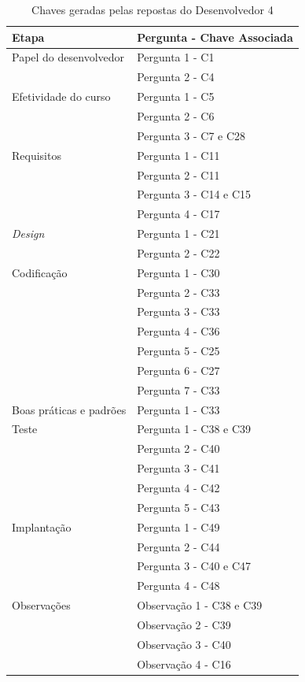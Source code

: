 \begin{table}[h]
	\centering
	\begin{tabular}{|m{4.8cm} | m{4.8cm} |}
		\hline
		\textbf{Etapa} & \textbf{Pergunta - Chave Associada} \\ \hline
		Papel do desenvolvedor & Pergunta 1 - C1 \\ \cline{2-2}
		& Pergunta 2 - C4 \\ \cline{2-2}
		\hline
		Efetividade do curso & Pergunta 1 - C5 \\ \cline{2-2}
		& Pergunta 2 - C6 \\ \cline{2-2}
		& Pergunta 3 - C7 e C28 \\ \cline{2-2}
		\hline
		Requisitos & Pergunta 1 - C11 \\ \cline{2-2}
		 & Pergunta 2 - C11 \\ \cline{2-2}
		& Pergunta 3 - C14 e C15 \\ \cline{2-2}
		& Pergunta 4 - C17 \\ \cline{2-2}
		\hline
		\textit{Design} & Pergunta 1 - C21 \\ \cline{2-2}
		& Pergunta 2 - C22 \\ \cline{2-2}
		\hline
		Codificação & Pergunta 1 - C30 \\ \cline{2-2}
		& Pergunta 2 - C33 \\ \cline{2-2}
		& Pergunta 3 - C33 \\ \cline{2-2}
		& Pergunta 4 - C36 \\ \cline{2-2}
		& Pergunta 5 - C25 \\ \cline{2-2}
		& Pergunta 6 - C27 \\ \cline{2-2}
		& Pergunta 7 - C33 \\ \cline{2-2} \hline
		Boas práticas e padrões & Pergunta 1 - C33 \\
		\hline
		Teste & Pergunta 1 - C38 e C39 \\ \cline{2-2}
		& Pergunta 2 - C40 \\ \cline{2-2}
		& Pergunta 3 - C41 \\ \cline{2-2}
		& Pergunta 4 - C42 \\ \cline{2-2}
		& Pergunta 5 - C43 \\ \cline{2-2}
		\hline
		Implantação & Pergunta 1 - C49 \\ \cline{2-2}
		& Pergunta 2 - C44  \\ \cline{2-2}
		& Pergunta 3 - C40 e C47 \\ \cline{2-2}
		& Pergunta 4 - C48 \\ \cline{2-2}
		\hline
		Observações & Observação 1 - C38 e C39 \\ \cline{2-2}
		& Observação 2 - C39 \\ \cline{2-2}
		& Observação 3 - C40 \\ \cline{2-2}
		& Observação 4 - C16 \\
		\hline
	\end{tabular}

	\caption{Chaves geradas pelas repostas do Desenvolvedor 4}
	\label{tab05}
\end{table}

